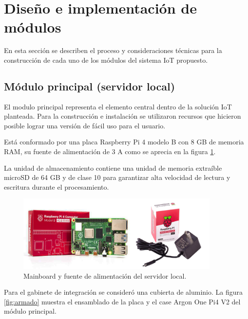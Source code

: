 \section{Diseño e implementación de módulos}

En esta sección se describen el proceso y consideraciones técnicas para la construcción de cada uno de los módulos del sistema IoT propuesto.

\subsection{Módulo principal (servidor local)}

El modulo principal representa el elemento central dentro de la solución IoT planteada. Para la construcción e instalación se utilizaron recursos que hicieron posible lograr una versión de fácil uso para el usuario.

Está conformado por una placa Raspberry Pi 4 modelo B con 8 GB de memoria RAM, su fuente de alimentación de 3 A como se aprecia en la figura \ref{fig:placarpi4}.

La unidad de almacenamiento contiene una unidad de memoria extraíble microSD de 64 GB y de clase 10 para garantizar alta velocidad de lectura y escritura durante el procesamiento.

\begin{figure}[htpb]
\centering 
\includegraphics[width=0.9\textwidth]{./Figures/placa.png}
\caption{Mainboard y fuente de alimentación del servidor local.}
\label{fig:placarpi4}
\end{figure}
Para el gabinete de integración se consideró una cubierta de aluminio. La figura \ref{fig:armado} muestra el ensamblado de la placa y el case Argon One Pi4 V2 del módulo principal.

